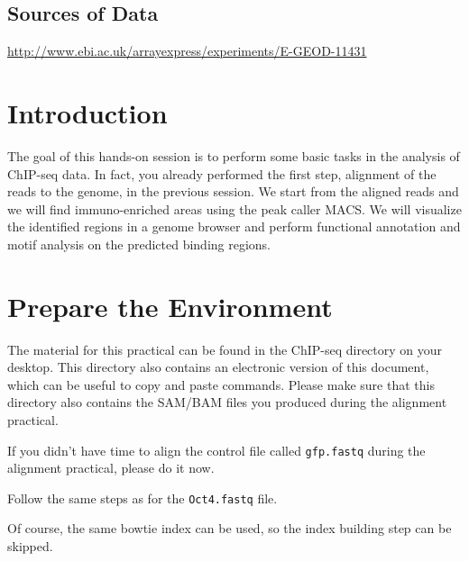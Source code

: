 \subsection{Sources of Data}
  \url{http://www.ebi.ac.uk/arrayexpress/experiments/E-GEOD-11431}


\newpage

\section{Introduction}

\begin{information}
The goal of this hands-on session is to perform some basic tasks in the analysis
of ChIP-seq data. In fact, you already performed the first step, alignment of
the reads to the genome, in the previous session. We start from the aligned
reads and we will find immuno-enriched areas using the peak caller MACS. We will
visualize the identified regions in a genome browser and perform functional
annotation and motif analysis on the predicted binding regions.
\end{information}

\section{Prepare the Environment}

\begin{information}
The material for this practical can be found in the ChIP-seq directory on your
desktop. This directory also contains an electronic version of this document,
which can be useful to copy and paste commands. Please make sure that this
directory also contains the SAM/BAM files you produced during the alignment
practical.
\end{information}

\begin{steps}
If you didn't have time to align the control file called \texttt{gfp.fastq} during the
alignment practical, please do it now.

Follow the same steps as for the \texttt{Oct4.fastq} file.
\end{steps}

\begin{information}
Of course, the same bowtie index can be used, so the index building step can be
skipped.
\end{information}

